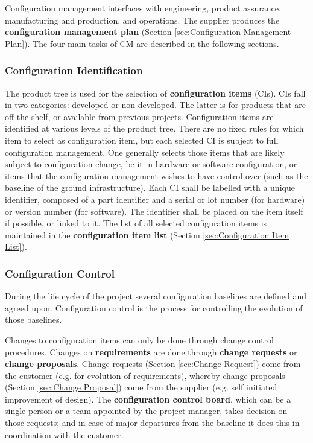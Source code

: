 Configuration management interfaces with engineering, product assurance, manufacturing and production, and operations. The supplier produces the \textbf{configuration management plan} (Section \ref{sec:Configuration Management Plan}). The four main tasks of CM are described in the following sections.

\subsubsection{Configuration Identification}

The product tree is used for the selection of \textbf{configuration items} (CIs). CIs fall in two categories: developed or non-developed. The latter is for products that are off-the-shelf, or available from previous projects. Configuration items are identified at various levels of the product tree. There are no fixed rules for which item to select as configuration item, but each selected CI is subject to full configuration management. One generally selects those items that are likely subject to configuration change, be it in hardware or software configuration, or items that the configuration management wishes to have control over (such as the baseline of the ground infrastructure). Each CI shall be labelled with a unique identifier, composed of a part identifier and a serial or lot number (for hardware) or version number (for software). The identifier shall be placed on the item itself if possible, or linked to it. The list of all selected configuration items is maintained in the \textbf{configuration item list} (Section \ref{sec:Configuration Item List}).

\subsubsection{Configuration Control}

During the life cycle of the project several configuration baselines are defined and agreed upon. Configuration control is the process for controlling the evolution of those baselines.

Changes to configuration items can only be done through change control procedures. Changes on \textbf{requirements} are done through \textbf{change requests} or \textbf{change proposals}. Change requests (Section \ref{sec:Change Request}) come from the customer (e.g. for evolution of requirements), whereby change proposals (Section \ref{sec:Change Proposal}) come from the supplier (e.g. self initiated improvement of design). The \textbf{configuration control board}, which can be a single person or a team appointed by the project manager, takes decision on those requests; and in case of major departures from the baseline it does this in coordination with the customer.

